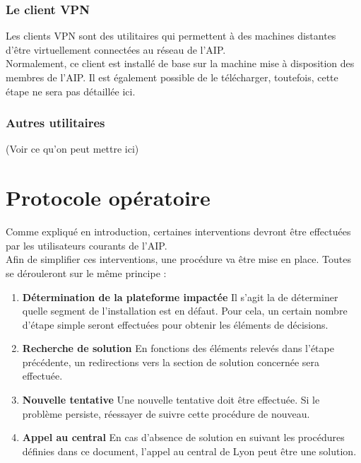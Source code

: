 \documentclass[a4paper]{article}
\begin{document}
\subsubsection{Le client VPN}
Les clients VPN sont des utilitaires qui permettent à des machines distantes d'être virtuellement connectées au réseau de l'AIP.\\
Normalement, ce client est installé de base sur la machine mise à disposition des membres de l'AIP. Il est également possible de le télécharger, toutefois, cette étape ne sera pas détaillée ici.

\subsubsection{Autres utilitaires}
(Voir ce qu'on peut mettre ici)


\section{Protocole opératoire}

Comme expliqué en introduction, certaines interventions devront être effectuées par les utilisateurs courants de l'AIP.\\
Afin de simplifier ces interventions, une procédure va être mise en place. Toutes se dérouleront sur le même principe : 
\begin{enumerate}
	\item \textbf{Détermination de la plateforme impactée} Il s'agit la de déterminer quelle segment de l'installation est en défaut. Pour cela, un certain nombre d'étape simple seront effectuées pour obtenir les éléments de décisions.
	\item \textbf{Recherche de solution} En fonctions des éléments relevés dans l'étape précédente, un redirections vers la section de solution concernée sera effectuée.
	\item \textbf{Nouvelle tentative} Une nouvelle tentative doit être effectuée. Si le problème persiste, réessayer de suivre cette procédure de nouveau.
	\item \textbf{Appel au central} En cas d'absence de solution en suivant les procédures définies dans ce document, l'appel au central de Lyon peut être une solution.
\end{enumerate}
\end{document}
